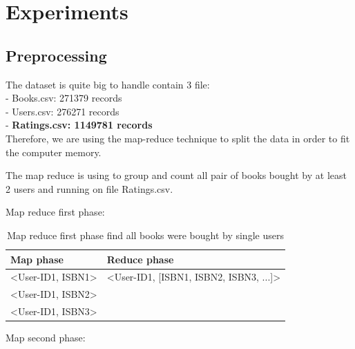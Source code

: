 \section{Experiments}
\subsection{Preprocessing}
The dataset is quite big to handle contain 3 file: \\
    - Books.csv: 271379 records \\
    - Users.csv: 276271 records \\ 
    - \textbf{Ratings.csv: 1149781 records} \\
    
Therefore, we are using the map-reduce technique to split the data in order to fit the computer memory.

The map reduce is using to group and count all pair of books bought by at least 2 users and running on file Ratings.csv. 

Map reduce first phase: 

    \begin{table}[H]
        \centering
        \begin{tabular}{|l|l|}
            \hline
             \textbf{Map phase}       &  \textbf{Reduce phase}\\ \hline
             <User-ID1, ISBN1> & <User-ID1, [ISBN1, ISBN2, ISBN3, ...]> \\
             <User-ID1, ISBN2> & \\
             <User-ID1, ISBN3> & \\ \hline
        \end{tabular}
        \caption{Map reduce first phase find all books were bought by single users}
        \label{tab:my_label}
    \end{table}

Map second phase: 

